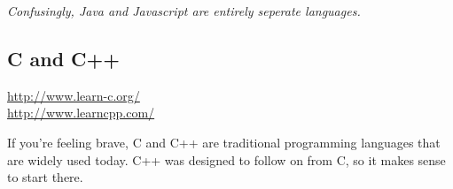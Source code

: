 		\footnotesize \textit{Confusingly, Java and Javascript are entirely seperate languages.} \normalsize
	
		\subsection*{C and C++}
		
		\url{http://www.learn-c.org/}
		\\ \url{http://www.learncpp.com/}
		
		If you're feeling brave, C and C++ are traditional programming languages that are widely used today. C++ was designed to follow on from C, so it makes sense to start there.